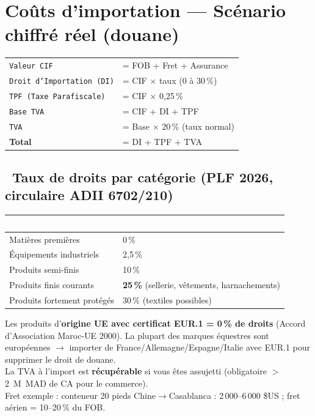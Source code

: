 \documentclass[11pt,a4paper]{article}
\newcommand{\thead}[1]{\textcolor{white}{\textbf{#1}}}
\begin{document}
\section{Coûts d'importation --- Scénario chiffré réel (douane)}

\begin{formulabox}
\begin{tabular}{@{}l@{\hspace{0.8em}}l@{}}
\texttt{Valeur CIF} & = FOB + Fret + Assurance\\
\texttt{Droit d'Importation (DI)} & = CIF $\times$ taux (0 à 30\,\%)\\
\texttt{TPF (Taxe Parafiscale)} & = CIF $\times$ 0,25\,\%\\
\texttt{Base TVA} & = CIF + DI + TPF\\
\texttt{TVA} & = Base $\times$ 20\,\% (taux normal)\\
\textbf{Total} & = DI + TPF + TVA\\
\end{tabular}
\end{formulabox}

\subsection{\faPercent\ Taux de droits par catégorie (PLF 2026, circulaire ADII 6702/210)}
{\small
\noindent
\begin{tabular}{L{12cm} L{3cm}}
\toprule
{}
\thead{Catégorie} & \thead{Taux DI}\\
\midrule
Matières premières & 0\,\%\\
Équipements industriels & 2,5\,\%\\
Produits semi-finis & 10\,\%\\
Produits finis courants & \textbf{25\,\%} (sellerie, vêtements, harnachements)\\
Produits fortement protégés & 30\,\% (textiles possibles)\\
\bottomrule
\end{tabular}}

\begin{keybox}
Les produits d'\textbf{origine UE avec certificat EUR.1 = 0\,\% de droits} (Accord d'Association Maroc-UE 2000). La plupart des marques équestres sont européennes $\rightarrow$ importer de France/Allemagne/Espagne/Italie avec EUR.1 pour supprimer le droit de douane.\\[1mm]
La TVA à l'import est \textbf{récupérable} si vous êtes assujetti (obligatoire $>$ 2~M~MAD de CA pour le commerce).\\[1mm]
Fret exemple : conteneur 20 pieds Chine$\rightarrow$Casablanca : 2\,000--6\,000 \$US ; fret aérien = 10--20\,\% du FOB.
\end{keybox}
\end{document}
